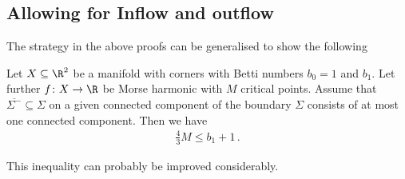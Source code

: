 
\subsection{Allowing for Inflow and outflow}

The strategy in the above proofs can be generalised to show the following
\begin{conjecture}
  Let $X\subseteq\R^2$ be a manifold with corners with Betti numbers $b_0=1$ and $b_1$.
  Let further $f\colon X\to\R$ be Morse harmonic with $M$ critical points.
  Assume that 
  $\overline{\Sigma^-}\subseteq\Sigma$ on a given connected component 
  of the boundary $\Sigma$
  consists of at most one connected component. Then we have
  \begin{align*}
    \frac{4}{3}M\leq b_1+1\,.
  \end{align*}
\end{conjecture}
This inequality can probably be improved considerably.

